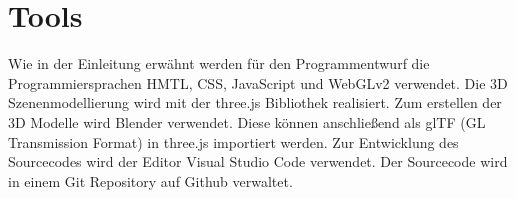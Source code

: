 \section{Tools}
Wie in der Einleitung erwähnt werden für den Programmentwurf die
Programmiersprachen HMTL, CSS, JavaScript und WebGLv2 verwendet.
Die 3D Szenenmodellierung wird mit der three.js Bibliothek realisiert.
Zum erstellen der 3D Modelle wird Blender verwendet. Diese können anschließend als
glTF (GL Transmission Format) in three.js importiert werden.
\newline
\newline
Zur Entwicklung des Sourcecodes wird der Editor Visual Studio Code verwendet.
Der Sourcecode wird in einem Git Repository auf Github verwaltet.